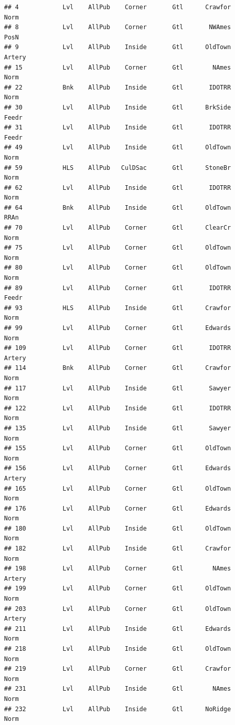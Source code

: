 \documentclass[]{article}
\begin{document}
\begin{verbatim}
## 4            Lvl    AllPub    Corner       Gtl      Crawfor       Norm
## 8            Lvl    AllPub    Corner       Gtl       NWAmes       PosN
## 9            Lvl    AllPub    Inside       Gtl      OldTown     Artery
## 15           Lvl    AllPub    Corner       Gtl        NAmes       Norm
## 22           Bnk    AllPub    Inside       Gtl       IDOTRR       Norm
## 30           Lvl    AllPub    Inside       Gtl      BrkSide      Feedr
## 31           Lvl    AllPub    Inside       Gtl       IDOTRR      Feedr
## 49           Lvl    AllPub    Inside       Gtl      OldTown       Norm
## 59           HLS    AllPub   CulDSac       Gtl      StoneBr       Norm
## 62           Lvl    AllPub    Inside       Gtl       IDOTRR       Norm
## 64           Bnk    AllPub    Inside       Gtl      OldTown       RRAn
## 70           Lvl    AllPub    Corner       Gtl      ClearCr       Norm
## 75           Lvl    AllPub    Corner       Gtl      OldTown       Norm
## 80           Lvl    AllPub    Corner       Gtl      OldTown       Norm
## 89           Lvl    AllPub    Corner       Gtl       IDOTRR      Feedr
## 93           HLS    AllPub    Inside       Gtl      Crawfor       Norm
## 99           Lvl    AllPub    Corner       Gtl      Edwards       Norm
## 109          Lvl    AllPub    Corner       Gtl       IDOTRR     Artery
## 114          Bnk    AllPub    Corner       Gtl      Crawfor       Norm
## 117          Lvl    AllPub    Inside       Gtl       Sawyer       Norm
## 122          Lvl    AllPub    Inside       Gtl       IDOTRR       Norm
## 135          Lvl    AllPub    Inside       Gtl       Sawyer       Norm
## 155          Lvl    AllPub    Corner       Gtl      OldTown       Norm
## 156          Lvl    AllPub    Corner       Gtl      Edwards     Artery
## 165          Lvl    AllPub    Corner       Gtl      OldTown       Norm
## 176          Lvl    AllPub    Corner       Gtl      Edwards       Norm
## 180          Lvl    AllPub    Inside       Gtl      OldTown       Norm
## 182          Lvl    AllPub    Inside       Gtl      Crawfor       Norm
## 198          Lvl    AllPub    Corner       Gtl        NAmes     Artery
## 199          Lvl    AllPub    Corner       Gtl      OldTown       Norm
## 203          Lvl    AllPub    Corner       Gtl      OldTown     Artery
## 211          Lvl    AllPub    Inside       Gtl      Edwards       Norm
## 218          Lvl    AllPub    Inside       Gtl      OldTown       Norm
## 219          Lvl    AllPub    Corner       Gtl      Crawfor       Norm
## 231          Lvl    AllPub    Inside       Gtl        NAmes       Norm
## 232          Lvl    AllPub    Inside       Gtl      NoRidge       Norm

\end{verbatim}
\end{document}
